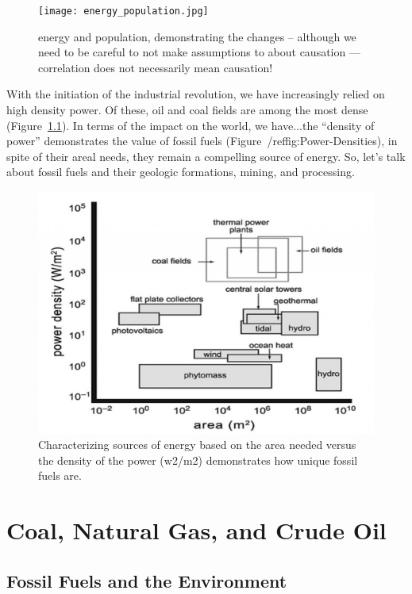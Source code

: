 \begin{figure}[h!]
	\centering
		\texttt{[image: energy\_population.jpg]}
	\caption{energy and population, demonstrating the changes -- although we need to be careful to not make assumptions to about causation --- correlation does not necessarily mean causation!}
	\label{fig:energy_population}
\end{figure}



With the initiation of the industrial revolution, we have increasingly relied on high density power. Of these, oil and coal fields are among the most dense (Figure~\ref{}). In terms of the impact on the world, we have...the ``density of power'' demonstrates the value of fossil fuels (Figure~/ref{fig:Power-Densities}), in spite of their areal needs, they remain a compelling source of energy. So, let's talk about fossil fuels and their geologic formations, mining, and processing.

\begin{figure}[h]
	\centering
		\includegraphics[width=1.00\textwidth]{graphics/Power-Densities.jpg}
	\caption{Characterizing sources of energy based on the area needed versus the density of the power (w2/m2) demonstrates how unique fossil fuels are. }
	\label{fig:Power-Densities}
\end{figure}


\section{Coal, Natural Gas, and Crude Oil}

\subsection{Fossil Fuels and the Environment}

